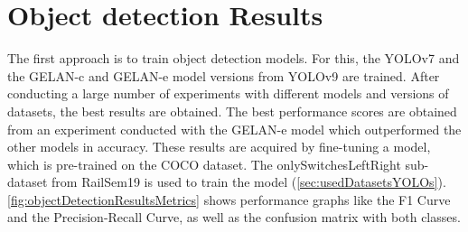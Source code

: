 \section{Object detection Results}
\label{sec:objectDetectionResults}

The first approach is to train object detection models.
For this, the \ac{YOLO}v7 and the \ac{GELAN}-c and \ac{GELAN}-e model versions from \ac{YOLO}v9 are trained.
After conducting a large number of experiments with different models and versions of datasets, the best results are obtained.
The best performance scores are obtained from an experiment conducted with the \ac{GELAN}-e model which outperformed the other models in accuracy.
These results are acquired by fine-tuning a model, which is pre-trained on the COCO dataset.
The onlySwitchesLeftRight sub-dataset from RailSem19 is used to train the model (\autoref{sec:usedDatasetsYOLOs}).
\autoref{fig:objectDetectionResultsMetrics} shows performance graphs like the F1 Curve and the Precision-Recall Curve, as well as the confusion matrix with both classes.

\vspace{0.5cm}

